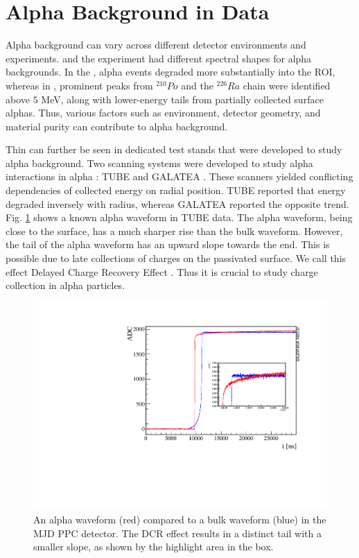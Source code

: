 \section{Alpha Background in Data}

Alpha background can vary across different detector environments and experiments. {\MJD} and the \Gerda experiment had different  spectral shapes for alpha backgrounds. In the {\MJD}, alpha events degraded more substantially into the ROI, whereas in \Gerda, prominent peaks from $^{210}Po$ and the $^{226}Ra$ chain were identified above $5$ MeV, along with lower-energy tails from partially collected surface alphas. Thus, various factors such as environment, detector geometry, and material purity can contribute to alpha background.


Thin can further be seen in dedicated test stands that were developed to study alpha background. Two scanning systems were developed to study alpha interactions in alpha : TUBE \cite{TUBE_paper} and GALATEA \cite{galatea_paper}. These scanners yielded conflicting dependencies of collected energy on radial position. TUBE reported that energy degraded inversely with radius, whereas GALATEA reported the opposite trend. Fig. \ref{fig:dcr_waveform} shows a known alpha waveform in TUBE data. The alpha waveform, being close to the surface, has a much sharper rise than the bulk waveform. However, the tail of the alpha waveform has an upward slope towards the end. This is possible due to late collections of charges on the passivated surface. We call this effect Delayed Charge Recovery Effect \cite{Gruszko:2017kfx}. Thus it is crucial to study charge collection in alpha particles.

\begin{figure}[!htb]
\centering
\includegraphics[width=0.8\linewidth]{ch3/figs/dcr_waveform.pdf}
\caption{An alpha waveform (red) compared to a bulk waveform (blue) in the MJD PPC detector. The DCR effect results in a distinct tail with a smaller slope, as shown by the highlight area in the box.\cite{TUBE_paper}}
\label{fig:dcr_waveform}
\end{figure}

